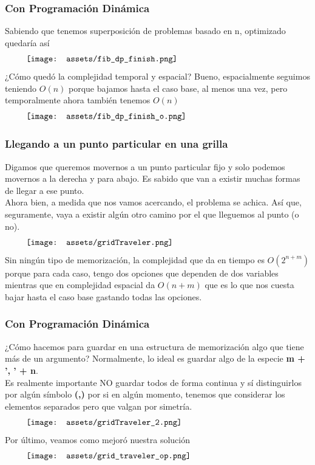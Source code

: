 \documentclass[10pt,a4paper]{article}
\begin{document}
\subsubsection*{Con Programación Dinámica}
Sabiendo que tenemos superposición de problemas basado en n, optimizado quedaría así
\[\begin{minipage}[b]{0.9\textwidth}
    \texttt{[image: assets/fib\_dp\_finish.png]}
\end{minipage}\]
¿Cómo quedó la complejidad temporal y espacial? Bueno, espacialmente seguimos teniendo $O(n)$ porque bajamos hasta el caso base, al menos una vez, pero temporalmente ahora también tenemos $O(n)$
\[\begin{minipage}[b]{0.9\textwidth}
    \texttt{[image: assets/fib\_dp\_finish\_o.png]}
\end{minipage}\]
\subsubsection*{Llegando a un punto particular en una grilla}
Digamos que queremos movernos a un punto particular fijo y solo podemos movernos a la derecha y para abajo. Es sabido que van a existir muchas formas de llegar a ese punto. \\
Ahora bien, a medida que nos vamos acercando, el problema se achica. Así que, seguramente, vaya a existir algún otro camino por el que lleguemos al punto (o no). 
\[\begin{minipage}[b]{0.9\textwidth}
    \texttt{[image: assets/gridTraveler.png]}
\end{minipage}\]
Sin ningún tipo de memorización, la complejidad que da en tiempo es $O(2^{n+m})$ porque para cada caso, tengo dos opciones que dependen de dos variables mientras que en complejidad espacial da $O(n+m)$ que es lo que nos cuesta bajar hasta el caso base gastando todas las opciones.
\subsubsection*{Con Programación Dinámica}
¿Cómo hacemos para guardar en una estructura de memorización algo que tiene más de un argumento? Normalmente, lo ideal es guardar algo de la especie \textbf{m + ', ' + n}. \\
Es realmente importante NO guardar todos de forma continua y sí distinguirlos por algún símbolo \textbf{(,)} por si en algún momento, tenemos que considerar los elementos separados pero que valgan por simetría.
\[\begin{minipage}[b]{0.9\textwidth}
    \texttt{[image: assets/gridTraveler\_2.png]}
\end{minipage}\]
Por último, veamos como mejoró nuestra solución\[\begin{minipage}[b]{0.9\textwidth}
    \texttt{[image: assets/grid\_traveler\_op.png]}
\end{minipage}\]
\end{document}
